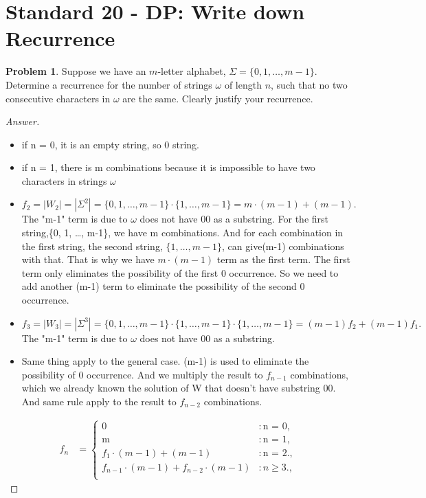 \documentclass[11pt]{article}
\theoremstyle{definition}
\theoremstyle{definition}
\newtheorem{required}{Problem}
\theoremstyle{definition}
\begin{document}
\newpage
\section{Standard 20 - DP: Write down Recurrence}

\begin{required}
Suppose we have an $m$-letter alphabet, $\Sigma = \{0, 1, \ldots, m-1\}$. Determine a recurrence for the number of strings $\omega$ of length $n$, such that no two consecutive characters in $\omega$ are the same. Clearly justify your recurrence.
\end{required}

\begin{proof}[Answer]
\begin{itemize}
\item if n = 0, it is an empty string, so 0 string.
\item if n = 1, there is m combinations because it is impossible to have two characters in strings $\omega$
\item $f_2 = |W_2|  = |\Sigma^{2}| = \{0, 1, \ldots, m-1\} \cdot \{1, \ldots, m-1\}= m\cdot (m-1) + (m-1).$ The "m-1" term is due to $\omega$ does not have $00$ as a substring. For the first string,\{0, 1, \ldots, m-1\}, we have m combinations. And for each combination in the first string, the second string, $\{1, \ldots, m-1\}$, can give(m-1) combinations with that. That is why we have $m\cdot (m-1)$ term as the first term. The first term only eliminates the possibility of the first $0$ occurrence. So we need to add another (m-1) term to eliminate the possibility of the second $0$ occurrence.
\item $f_3 = |W_3|  = |\Sigma^{3}| = \{0, 1, \ldots, m-1\} \cdot \{1, \ldots, m-1\} \cdot \{1, \ldots, m-1\}= (m-1)f_2 + (m-1)f_1.$ The "m-1" term is due to $\omega$ does not have $00$ as a substring.
\item Same thing apply to the general case. (m-1) is used to eliminate the possibility of $0$ occurrence. And we multiply the result to $f_{n-1}$ combinations, which we already known the solution of W that doesn't have substring $00$. And same rule apply to the result to $f_{n-2}$ combinations.

\end{itemize}
\begin{align*}
f_{n} &= \begin{cases} \text{0} & : \text{n = 0}, \\ 
\text{m} & : \text{n = 1},\\
\text{$f_1\cdot (m-1) + (m-1)$} & : \text{n = 2}.,\\
\text{$f_{n-1}\cdot (m-1) + f_{n-2}\cdot(m-1)$} & : \text{$n \geq 3$}.,\\
\end{cases}
\end{align*}
\end{proof}


\begin{comment}
\begin{align*}
f_{n} &= \begin{cases}
\text{case1} & : \text{condition1}, \\
\text{case2} & : \text{condition2}. 
\end{cases}
\end{align*}
\end{comment}

\end{document}
